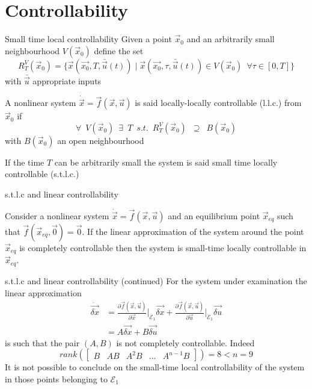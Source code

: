 \section{Controllability}

\begin{frame}{Small time local controllability}
  Given a point $\vec{x}_0$ and an arbitrarily small neighbourhood $V(\vec{x}_0)$ define the set
  \[
  R_{T}^{V}(\vec{x}_0) = \{\vec{x}(\vec{x_0}, T, \bar{\vec{u}}(t)) \mid
  \vec{x}(\vec{x_0}, \tau, \bar{\vec{u}}(t)) \in V(\vec{x}_0) \enspace \forall \tau \in [0,T]\}
  \]
  with $\bar{\vec{u}}$ appropriate inputs
  \par
  A nonlinear system $\dot{\vec{x}} = \vec{f}(\vec{x}, \vec{u})$ is said locally-locally controllable (l.l.c.) from $\vec{x}_0$ if
  \[
  \forall \enspace V(\vec{x}_0) \enspace \exists  \enspace T \enspace
  s.t. \enspace R_{T}^{V}(\vec{x}_0) \enspace \supseteq \enspace B(\vec{x}_0)
  \]
  with $B(\vec{x}_0)$ an open neighbourhood
  \par
  If the time $T$ can be arbitrarily small the system is said small time locally controllable (s.t.l.c.)
\end{frame}

\begin{frame}{s.t.l.c and linear controllability}
  \begin{theorem}
    Consider a nonlinear system $\dot{\vec{x}} = \vec{f}(\vec{x}, \vec{u})$ and an equilibrium point $\vec{x}_{eq}$
    such that $\vec{f}(\vec{x}_{eq}, \vec{0}) = \vec{0}$. If the linear approximation of the system around
    the point $\vec{x}_{eq}$ is completely controllable then the system is small-time locally controllable
    in $\vec{x}_{eq}$.
  \end{theorem}
\end{frame}

\begin{frame}{s.t.l.c and linear controllability (continued)}
  For the system under examination the linear approximation
  \[
  \begin{split}
    \dot{\vec{\delta x}} &= \frac{\partial{\vec{f}(\vec{x},\vec{u})}}{\partial{\vec{x}}}\Big|_{\mathcal{E}_1} \vec{\delta x} +
    \frac{\partial{\vec{f}(\vec{x},\vec{u})}}{\partial{\vec{u}}}\Big|_{\mathcal{E}_1} \vec{\delta u}\\
    &= A \vec{\delta x} + B \vec{\delta u}
  \end{split}
  \]
  is such that the pair $(A, B)$ is not completely controllable. Indeed
  \[
  rank\left(
  \begin{bmatrix}
    B & AB & A^2B & \dots & A^{n-1}B
  \end{bmatrix}
  \right) = 8 < n = 9
  \]
  It is not possible to conclude on the small-time local controllability of the system
  in those points belonging to $\mathcal{E}_1$
\end{frame}

